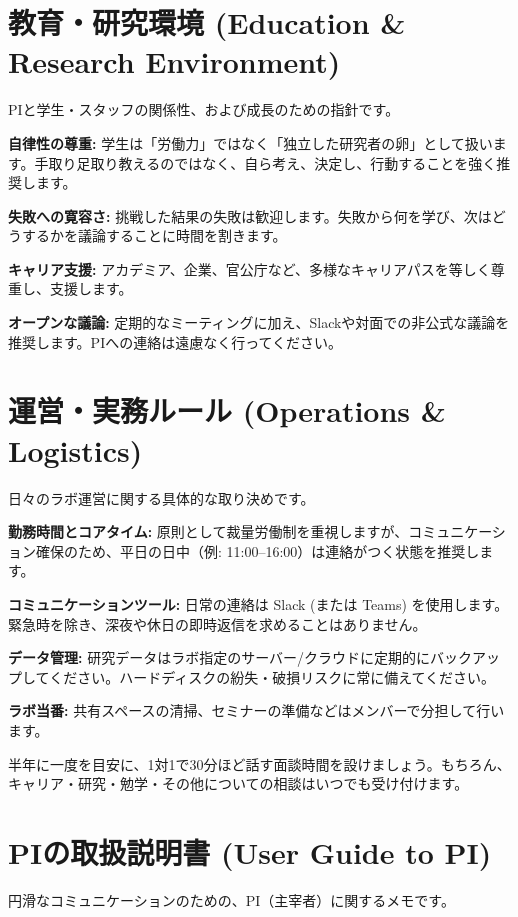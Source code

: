 \documentclass[a4paper,11pt]{ltjsarticle}
\begin{document}
\section{教育・研究環境 (Education \& Research Environment)}
PIと学生・スタッフの関係性、および成長のための指針です。

\begin{compactitem}
    \item \textbf{自律性の尊重:} 学生は「労働力」ではなく「独立した研究者の卵」として扱います。手取り足取り教えるのではなく、自ら考え、決定し、行動することを強く推奨します。
    \item \textbf{失敗への寛容さ:} 挑戦した結果の失敗は歓迎します。失敗から何を学び、次はどうするかを議論することに時間を割きます。
    \item \textbf{キャリア支援:} アカデミア、企業、官公庁など、多様なキャリアパスを等しく尊重し、支援します。
    \item \textbf{オープンな議論:} 定期的なミーティングに加え、Slackや対面での非公式な議論を推奨します。PIへの連絡は遠慮なく行ってください。
\end{compactitem}

\section{運営・実務ルール (Operations \& Logistics)}
日々のラボ運営に関する具体的な取り決めです。

\begin{compactitem}
    \item \textbf{勤務時間とコアタイム:} 原則として裁量労働制を重視しますが、コミュニケーション確保のため、平日の日中（例: 11:00--16:00）は連絡がつく状態を推奨します。
    \item \textbf{コミュニケーションツール:} 日常の連絡は Slack (または Teams) を使用します。緊急時を除き、深夜や休日の即時返信を求めることはありません。
    \item \textbf{データ管理:} 研究データはラボ指定のサーバー/クラウドに定期的にバックアップしてください。ハードディスクの紛失・破損リスクに常に備えてください。
    \item \textbf{ラボ当番:} 共有スペースの清掃、セミナーの準備などはメンバーで分担して行います。
    \item 半年に一度を目安に、1対1で30分ほど話す面談時間を設けましょう。もちろん、キャリア・研究・勉学・その他についての相談はいつでも受け付けます。
\end{compactitem}

\section{PIの取扱説明書 (User Guide to PI)}
円滑なコミュニケーションのための、PI（主宰者）に関するメモです。
\end{document}
